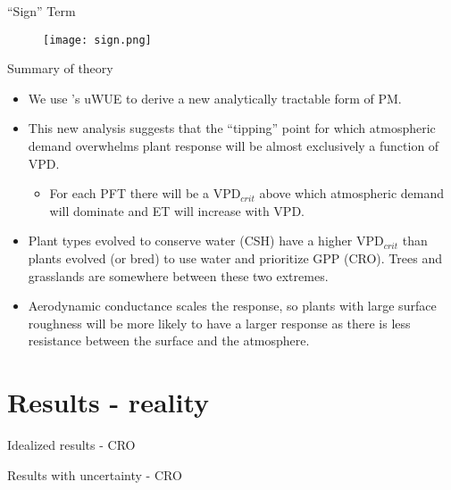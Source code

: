 \documentclass{beamer}
\begin{document}
\begin{frame}{``Sign'' Term}
  \begin{figure}
    \texttt{[image: sign.png]}
  \end{figure}
\end{frame}

\begin{frame}{Summary of theory}
  \begin{itemize}
  \item We use \cite{Zhou_2016}'s uWUE to derive a new analytically tractable form of PM.
  \item This new analysis suggests that the ``tipping'' point for which atmospheric demand overwhelms plant response will be almost exclusively a function of VPD.
    \begin{itemize}
    \item For each PFT there will be a VPD$_{crit}$ above which atmospheric demand will dominate and ET will increase with VPD.
    \end{itemize}
  \item Plant types evolved to conserve water (CSH) have a higher VPD$_{crit}$ than plants evolved (or bred) to use water and prioritize GPP (CRO). Trees and grasslands are somewhere between these two extremes.
  \item Aerodynamic conductance scales the response, so plants with large surface roughness will be more likely to have a larger response as there is less resistance between the surface and the atmosphere.
  \end{itemize}
\end{frame}

\section{Results - reality}
{ %
    \begin{frame}[plain]{Idealized results - CRO}
     \end{frame}
}

{ %
    \begin{frame}[plain]{Results with uncertainty - CRO}
     \end{frame}
}
\end{document}

